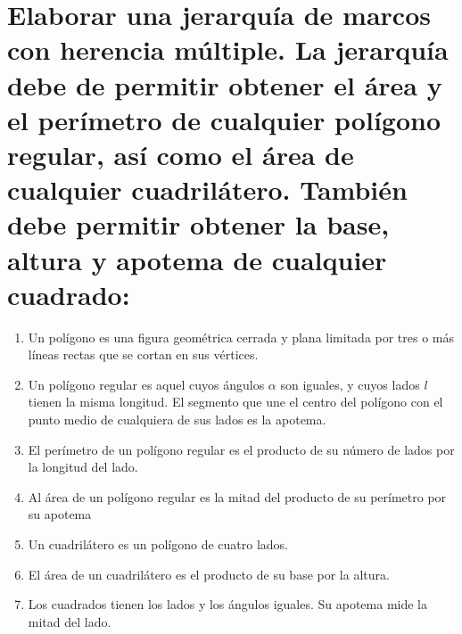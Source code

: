 \documentclass[10pt, a4paper,spanish]{article}
\begin{document}
			\paragraph{}



	\section{Elaborar una jerarquía de marcos con herencia múltiple. La jerarquía debe de permitir obtener el área y el perímetro de cualquier polígono regular, así como el área de cualquier cuadrilátero. También debe permitir obtener la base, altura y apotema de cualquier cuadrado:}


		\begin{enumerate}[label=\alph*)]

			\item Un polígono es una figura geométrica cerrada y plana limitada por tres o más líneas rectas que se cortan en sus vértices.

			\item Un polígono regular es aquel cuyos ángulos $\alpha$ son iguales, y cuyos lados $l$ tienen la misma longitud. El segmento que une el centro del polígono con el punto medio de cualquiera de sus lados es la apotema.

			\item El perímetro de un polígono regular es el producto de su número de lados por la longitud del lado.

			\item Al área de un polígono regular es la mitad del producto de su perímetro por su apotema

			\item Un cuadrilátero es un polígono de cuatro lados.

			\item El área de un cuadrilátero es el producto de su base por la altura.

			\item Los cuadrados tienen los lados y los ángulos iguales. Su apotema mide la mitad del lado.

		\end{enumerate}


		\paragraph{}
\end{document}
